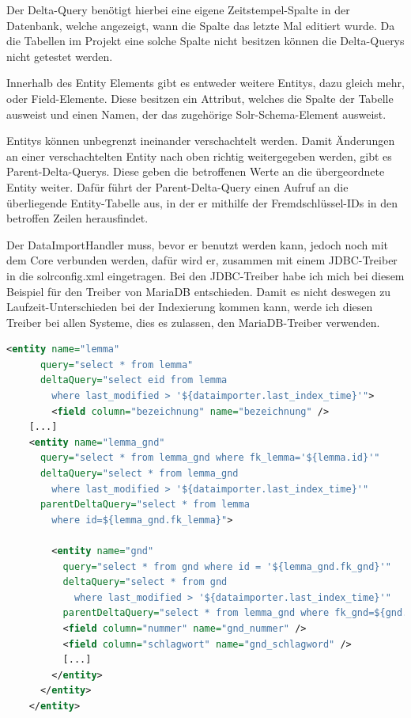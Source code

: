Der Delta-Query benötigt hierbei eine eigene Zeitstempel-Spalte in der Datenbank, welche angezeigt, wann die Spalte das letzte Mal editiert wurde. Da die Tabellen im Projekt eine solche Spalte nicht besitzen können die Delta-Querys nicht getestet werden. 

Innerhalb des Entity Elements gibt es entweder weitere Entitys, dazu gleich mehr, oder Field-Elemente. Diese besitzen ein Attribut, welches die Spalte der Tabelle ausweist und einen Namen, der das zugehörige Solr-Schema-Element ausweist. 

Entitys können unbegrenzt ineinander verschachtelt werden. Damit Änderungen an einer verschachtelten Entity nach oben richtig weitergegeben werden, gibt es Parent-Delta-Querys. Diese geben die betroffenen Werte an die übergeordnete Entity weiter. Dafür führt der Parent-Delta-Query einen Aufruf an die überliegende Entity-Tabelle aus, in der er mithilfe der Fremdschlüssel-IDs in den betroffen Zeilen herausfindet.

Der DataImportHandler muss, bevor er benutzt werden kann, jedoch noch mit dem Core verbunden werden, dafür wird er, zusammen mit einem JDBC-Treiber in die solrconfig.xml eingetragen. Bei den JDBC-Treiber habe ich mich bei diesem Beispiel für den Treiber von MariaDB entschieden. Damit es nicht deswegen zu Laufzeit-Unterschieden bei der Indexierung kommen kann, werde ich diesen Treiber bei allen Systeme, dies es zulassen, den MariaDB-Treiber verwenden.

\begin{lstlisting}[language=xml, frame=single, label={lst:dih}, 
    morekeywords={entity,query,deltaQuery,parentDeltaQuery,field,column, name}] 
    <entity name="lemma" 
      query="select * from lemma" 
      deltaQuery="select eid from lemma 
        where last_modified > '${dataimporter.last_index_time}'"> 
		<field column="bezeichnung" name="bezeichnung" />
    [...]
    <entity name="lemma_gnd" 
      query="select * from lemma_gnd where fk_lemma='${lemma.id}'"
      deltaQuery="select * from lemma_gnd 
        where last_modified > '${dataimporter.last_index_time}'"
      parentDeltaQuery="select * from lemma 
        where id=${lemma_gnd.fk_lemma}">
			
        <entity name="gnd" 
          query="select * from gnd where id = '${lemma_gnd.fk_gnd}'"
          deltaQuery="select * from gnd 
            where last_modified > '${dataimporter.last_index_time}'"
          parentDeltaQuery="select * from lemma_gnd where fk_gnd=${gnd.id}">
          <field column="nummer" name="gnd_nummer" />
          <field column="schlagwort" name="gnd_schlagword" />
          [...]
        </entity>
      </entity>  
    </entity>
\end{lstlisting}

